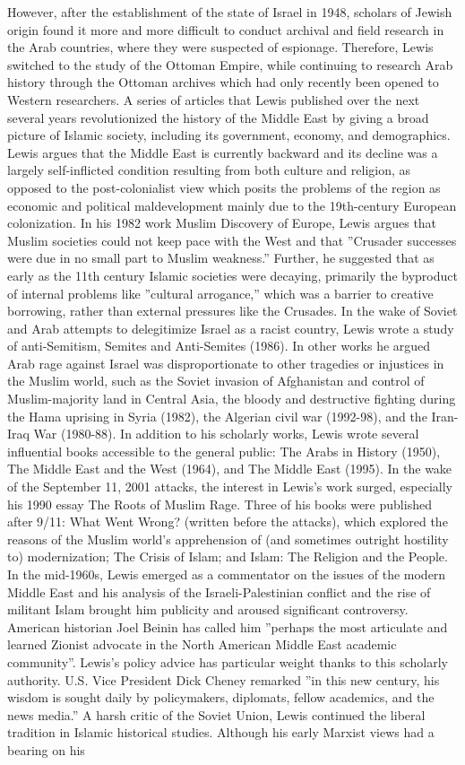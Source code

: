 \documentclass[11pt,a4paper, onecolumn]{article}
\begin{document}
However, after the establishment of the state of Israel in 1948, scholars of Jewish origin found it more and more difficult to conduct archival and field research in the Arab countries, where they were suspected of espionage. Therefore, Lewis switched to the study of the Ottoman Empire, while continuing to research Arab history through the Ottoman archives which had only recently been opened to Western researchers. A series of articles that Lewis published over the next several years revolutionized the history of the Middle East by giving a broad picture of Islamic society, including its government, economy, and demographics. Lewis argues that the Middle East is currently backward and its decline was a largely self-inflicted condition resulting from both culture and religion, as opposed to the post-colonialist view which posits the problems of the region as economic and political maldevelopment mainly due to the 19th-century European colonization. In his 1982 work Muslim Discovery of Europe, Lewis argues that Muslim societies could not keep pace with the West and that ''Crusader successes were due in no small part to Muslim weakness.'' Further, he suggested that as early as the 11th century Islamic societies were decaying, primarily the byproduct of internal problems like ''cultural arrogance,'' which was a barrier to creative borrowing, rather than external pressures like the Crusades. In the wake of Soviet and Arab attempts to delegitimize Israel as a racist country, Lewis wrote a study of anti-Semitism, Semites and Anti-Semites (1986). In other works he argued Arab rage against Israel was disproportionate to other tragedies or injustices in the Muslim world, such as the Soviet invasion of Afghanistan and control of Muslim-majority land in Central Asia, the bloody and destructive fighting during the Hama uprising in Syria (1982), the Algerian civil war (1992-98), and the Iran-Iraq War (1980-88). In addition to his scholarly works, Lewis wrote several influential books accessible to the general public: The Arabs in History (1950), The Middle East and the West (1964), and The Middle East (1995). In the wake of the September 11, 2001 attacks, the interest in Lewis's work surged, especially his 1990 essay The Roots of Muslim Rage. Three of his books were published after 9/11: What Went Wrong? (written before the attacks), which explored the reasons of the Muslim world's apprehension of (and sometimes outright hostility to) modernization; The Crisis of Islam; and Islam: The Religion and the People. In the mid-1960s, Lewis emerged as a commentator on the issues of the modern Middle East and his analysis of the Israeli-Palestinian conflict and the rise of militant Islam brought him publicity and aroused significant controversy. American historian Joel Beinin has called him ''perhaps the most articulate and learned Zionist advocate in the North American Middle East academic community''. Lewis's policy advice has particular weight thanks to this scholarly authority. U.S. Vice President Dick Cheney remarked ''in this new century, his wisdom is sought daily by policymakers, diplomats, fellow academics, and the news media.'' A harsh critic of the Soviet Union, Lewis continued the liberal tradition in Islamic historical studies. Although his early Marxist views had a bearing on his 
\end{document}
